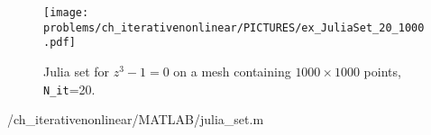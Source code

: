\begin{problem}
\begin{subproblem}[4]
\begin{solution}
    \begin{figure}[hbt]   \begin{center}
        \texttt{[image: \\problems/ch\_iterativenonlinear/PICTURES/ex\_JuliaSet\_20\_1000.pdf]} %
        \caption{Julia set for $z^3-1=0$ on a mesh containing $1000\times1000$ points, \texttt{N\_it}=20.}
        \end{center} \end{figure}


{\problems/ch_iterativenonlinear/MATLAB/julia_set.m}
\end{solution}
\end{subproblem}
\end{problem}
